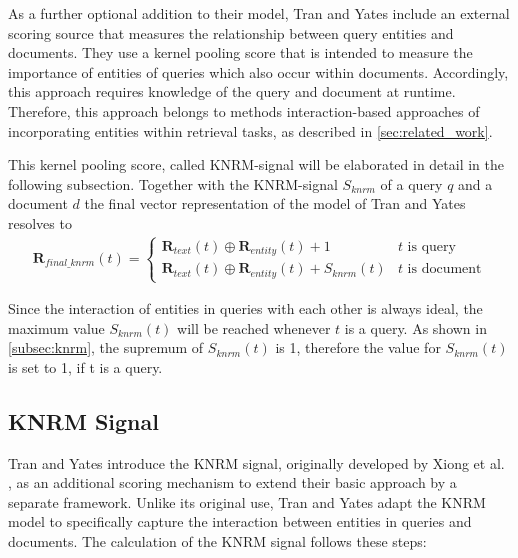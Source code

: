 As a further optional addition to their model, Tran and Yates include an external scoring source that measures the relationship between query entities and documents. They use a kernel pooling score that is intended to measure the importance of entities of queries which also occur within documents. Accordingly, this approach requires knowledge of the query and document at runtime. Therefore, this approach belongs to methods interaction-based approaches of incorporating entities within retrieval tasks, as described in \autoref{sec:related_work}.

This kernel pooling score, called KNRM-signal will be elaborated in detail in the following subsection. Together with the KNRM-signal $S_{knrm}$ of a query $q$ and a document $d$ the final vector representation of the model of Tran and Yates resolves to 
\begin{align}
    \mathbf{R}_{final\_knrm}(t) =
    \begin{cases}
         \mathbf{R}_{text}(t) \oplus \mathbf{R}_{entity}(t) + 1 & t \text{~is query} \\
         \mathbf{R}_{text}(t) \oplus \mathbf{R}_{entity}(t) + S_{knrm}(t) & t \text{~is document} \label{eq:knrm}
    \end{cases}
\end{align}

Since the interaction of entities in queries with each other is always ideal, the maximum value $S_{knrm}(t)$ will be reached whenever $t$ is a query. As shown in \autoref{subsec:knrm}, the supremum of $S_{knrm}(t)$ is 1, therefore the value for $S_{knrm}(t)$ is set to 1, if t is a query.

\subsection{KNRM Signal}\label{subsec:knrm}

Tran and Yates introduce the KNRM signal, originally developed by Xiong et al. \cite{xiong2017end}, as an additional scoring mechanism to extend their basic approach by a separate framework. Unlike its original use, Tran and Yates adapt the KNRM model to specifically capture the interaction between entities in queries and documents. The calculation of the KNRM signal follows these steps:

